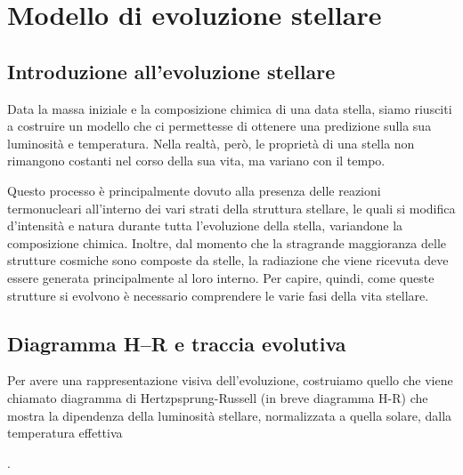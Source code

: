 \section{Modello di evoluzione stellare}\label{sec:modello-evoluzione-stellare}

\subsection{Introduzione all'evoluzione stellare}
Data la massa iniziale e la composizione chimica di una data stella, siamo riusciti a costruire un modello che ci permettesse di ottenere una predizione sulla sua luminosità e temperatura. Nella realtà, però, le proprietà di una stella non rimangono costanti nel corso della sua vita, ma variano con il tempo.

Questo processo è principalmente dovuto alla presenza delle reazioni termonucleari all'interno dei vari strati della struttura stellare, le quali si modifica d'intensità e natura durante tutta l'evoluzione della stella, variandone la composizione chimica. Inoltre, dal momento  che la stragrande maggioranza delle strutture cosmiche sono composte da stelle, la radiazione che viene ricevuta deve essere generata principalmente al loro interno. Per capire, quindi, come queste strutture si evolvono è necessario comprendere le varie fasi della vita stellare.

\subsection{Diagramma H--R e traccia evolutiva}

Per avere una rappresentazione visiva dell'evoluzione, costruiamo quello che viene chiamato diagramma di Hertzpsprung-Russell (in breve diagramma H-R) che mostra la dipendenza della luminosità stellare, normalizzata a quella solare, dalla temperatura effettiva .

